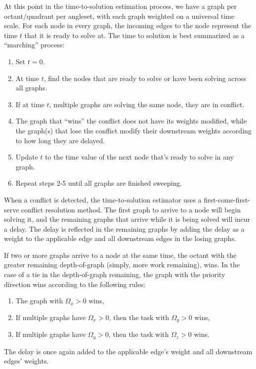 At this point in the time-to-solution estimation process, we have a graph per octant/quadrant per angleset, with each graph weighted on a universal time scale.
For each node in every graph, the incoming edges to the node represent the time $t$ that it is ready to solve at.
The time to solution is best summarized as a ``marching'' process:
    \begin{enumerate}
      \item Set $t = 0$.
      \item At time $t$, find the nodes that are ready to solve or have been solving across all graphs.
      \item If at time $t$, multiple graphs are solving the same node, they are in conflict.
      \item The graph that ``wins'' the conflict does not have its weights modified, while the graph(s) that lose the conflict modify their downstream weights according to how long they are delayed.
      \item Update $t$ to the time value of the next node that's ready to solve in any graph.
      \item Repeat steps 2-5 until all graphs are finished sweeping.
    \end{enumerate}

When a conflict is detected, the time-to-solution estimator uses a first-come-first-serve conflict resolution method.
The first graph to arrive to a node will begin solving it, and the remaining graphs that arrive while it is being solved will incur a delay.
The delay is reflected in the remaining graphs by adding the delay as a weight to the applicable edge and all downstream edges in the losing graphs.

If two or more graphs arrive to a node at the same time, the octant with the greater remaining depth-of-graph (simply, more work remaining), wins.
In the case of a tie in the depth-of-graph remaining, the graph with the priority direction wins according to the following rules:
\begin{enumerate}
    \item The graph with $\Omega_x > 0$ wins,
	\item If multiple graphs have $\Omega_x > 0$, then the task with $\Omega_y > 0$ wins,
	\item If multiple graphs have $\Omega_y > 0$, then the task with $\Omega_z > 0$ wins.
\end{enumerate}
The delay is once again added to the applicable edge's weight and all downstream edges' weights.

